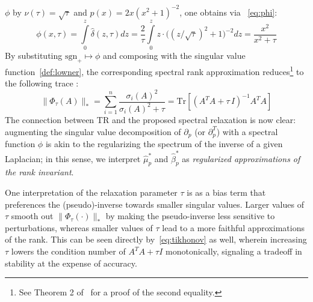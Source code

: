 \documentclass[10pt]{article}
\numberwithin{equation}{section}
\newcommand{\+}{%
	\raisebox{0.18ex}{\scaleobj{0.55}{+}}
}
\theoremstyle{definition}
\theoremstyle{definition}
\begin{document}
$\phi$ by $\nu(\tau) = \sqrt{\tau}$ and $p(x) = 2x (x^2 + 1)^{-2}$, one obtains via ~\eqref{eq:phi}:
\begin{equation}
	\phi(x, \tau) = \int\limits_{0}^z \hat{\delta}(z, \tau) dz = \frac{2}{\tau}\int\limits_{0}^z z \cdot  \big((z/\sqrt{\tau})^2+1\big)^{-2} dz = \frac{x^2}{x^2 + \tau} %
\end{equation}
By substituting $\mathrm{sgn}_+ \mapsto \phi$ and composing with the singular value function~\eqref{def:lowner}, the corresponding spectral rank approximation reduces\footnote{See Theorem 2 of~\cite{zhao2012approximation} for a proof of the second equality.} to the following trace :
\begin{equation}\label{eq:tikhonov_1}
	\lVert \Phi_\tau(A) \rVert_\ast = \sum\limits_{i = 1}^n \frac{\sigma_i(A)^2}{\sigma_i(A)^2 + \tau} = \mathrm{Tr}\left[(A^T A + \tau \, I)^{-1} A^T A \right]
\end{equation}
The connection between TR and the proposed spectral relaxation is now clear: augmenting the singular value decomposition of $\partial_p$ (or $\partial_p^T$) with a spectral function $\phi$ is akin to the regularizing the spectrum of the inverse of a given Laplacian; 
in this sense, we interpret $\hat{\mu}_p^\ast$ and $\hat{\beta}_p^\ast$ as \emph{regularized approximations of the rank invariant}.

 One interpretation of the relaxation parameter $\tau$ is as a bias term that preferences the (pseudo)-inverse towards smaller singular values.
Larger values of $\tau$ smooth out $\lVert \Phi_\tau(\cdot) \rVert_\ast$ by making the pseudo-inverse less sensitive to perturbations, whereas smaller values of $\tau$ lead to a more faithful approximations of the rank.
This can be seen directly by~\eqref{eq:tikhonov} as well, wherein increasing $\tau$ lowers the condition number of $A^T A + \tau I$ monotonically, signaling a tradeoff in stability at the expense of accuracy. 
\end{document}
